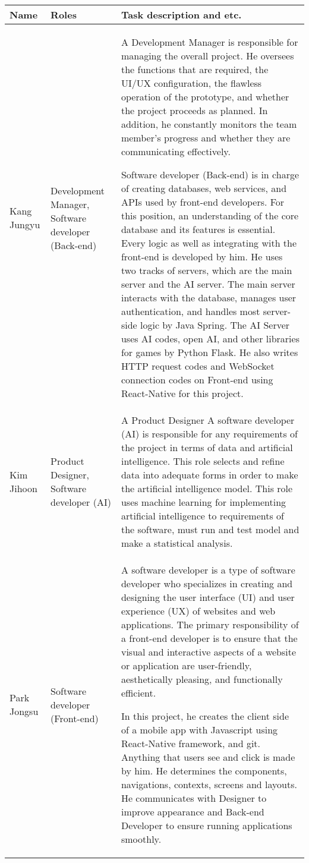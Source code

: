 \documentclass[conference]{IEEEtran}
\begin{document}
 \begin{tabular}{|p{1.2cm}|p{1.5cm}|p{5cm}|} 
 \hline
 Name & Roles & Task description and etc. \\ [0.5ex] 
 \hline
 Kang Jungyu & Development Manager, Software developer (Back-end) &  
 A Development Manager is responsible for managing the overall project. He oversees the functions that are required, the UI/UX configuration, the flawless operation of the prototype, and whether the project proceeds as planned. In addition, he constantly monitors the team member’s progress and whether they are communicating effectively.
 
 Software developer (Back-end) is in charge of creating databases, web services, and APIs used by front-end developers. For this position, an understanding of the core database and its features is essential. Every logic as well as integrating with the front-end is developed by him. He uses two tracks of servers, which are the main server and the AI server. The main server interacts with the database, manages user authentication, and handles most server-side logic by Java Spring. The AI Server uses AI codes, open AI, and other libraries for games by Python Flask. He also writes HTTP request codes and WebSocket connection codes on Front-end using React-Native for this project.\\ 
 \hline
 Kim Jihoon & Product Designer, Software developer (AI) & 
 A Product Designer
 A software developer (AI) is responsible for any requirements of the project in terms of data and artificial intelligence. This role selects and refine data into adequate forms in order to make the artificial intelligence model. This role uses machine learning for implementing artificial intelligence to requirements of the software, must run and test model and make a statistical analysis.\\
 \hline
 Park Jongsu & Software developer (Front-end) & 
 A software developer is a type of software developer who specializes in creating and designing the user interface (UI) and user experience (UX) of websites and web applications. The primary responsibility of a front-end developer is to ensure that the visual and interactive aspects of a website or application are user-friendly, aesthetically pleasing, and functionally efficient.
 
In this project, he creates  the client side of  a mobile app with Javascript using React-Native framework, and git.  Anything that users see and click is made by him. He determines the components, navigations, contexts, screens and layouts.  He communicates with Designer to improve appearance and Back-end Developer to ensure running applications smoothly.
\\ [1ex] 
 \hline
\end{tabular}
\end{document}
